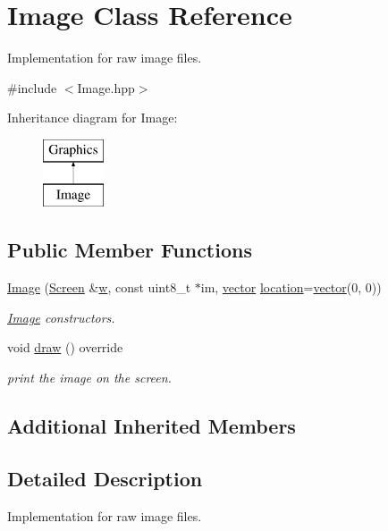 \hypertarget{class_image}{}\section{Image Class Reference}
\label{class_image}


Implementation for raw image files.  




{\ttfamily \#include $<$Image.\+hpp$>$}

Inheritance diagram for Image\+:\begin{figure}[H]
\begin{center}
\leavevmode
\includegraphics[height=2.000000cm]{class_image}
\end{center}
\end{figure}
\subsection*{Public Member Functions}
\begin{DoxyCompactItemize}
\item 
\hyperlink{class_image_aaa4504304ed8b2fa33bb6b4fc52a2199}{Image} (\hyperlink{class_screen}{Screen} \&\hyperlink{class_graphics_a7a73ddd0d3cf1b67fc54f303be017c3b}{w}, const uint8\+\_\+t $\ast$im, \hyperlink{classvector}{vector} \hyperlink{class_graphics_a88c2112c7a3db3ee56f4c7fe2cac6055}{location}=\hyperlink{classvector}{vector}(0, 0))
\begin{DoxyCompactList}\small\item\em \hyperlink{class_image}{Image} constructors. \end{DoxyCompactList}\item 
void \hyperlink{class_image_af67dbed0b509945e278bdd88088615cf}{draw} () override
\begin{DoxyCompactList}\small\item\em print the image on the screen. \end{DoxyCompactList}\end{DoxyCompactItemize}
\subsection*{Additional Inherited Members}


\subsection{Detailed Description}
Implementation for raw image files. 

